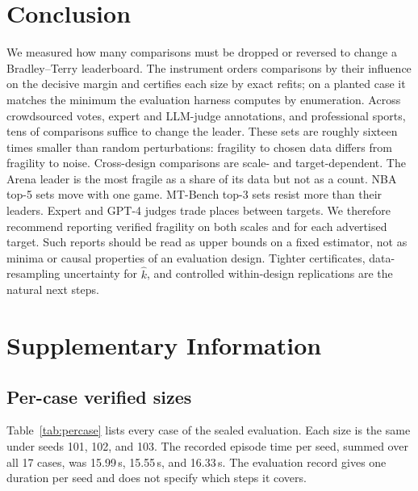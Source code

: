 \documentclass{article}
\newcommand{\kver}{\hat{k}}
\begin{document}
\section{Conclusion}
\label{sec:conclusion}

We measured how many comparisons must be dropped or reversed to change a Bradley--Terry leaderboard. The instrument orders comparisons by their influence on the decisive margin and certifies each size by exact refits; on a planted case it matches the minimum the evaluation harness computes by enumeration. Across crowdsourced votes, expert and LLM-judge annotations, and professional sports, tens of comparisons suffice to change the leader. These sets are roughly sixteen times smaller than random perturbations: fragility to chosen data differs from fragility to noise. Cross-design comparisons are scale- and target-dependent. The Arena leader is the most fragile as a share of its data but not as a count. NBA top-5 sets move with one game. MT-Bench top-3 sets resist more than their leaders. Expert and GPT-4 judges trade places between targets. We therefore recommend reporting verified fragility on both scales and for each advertised target. Such reports should be read as upper bounds on a fixed estimator, not as minima or causal properties of an evaluation design. Tighter certificates, data-resampling uncertainty for $\kver$, and controlled within-design replications are the natural next steps.

\clearpage



\clearpage
\appendix
\section{Supplementary Information}
\label{app:si}

\subsection{Per-case verified sizes}
\label{app:percase}

Table~\ref{tab:percase} lists every case of the sealed evaluation. Each size is the same under seeds 101, 102, and 103. The recorded episode time per seed, summed over all 17 cases, was 15.99\,s, 15.55\,s, and 16.33\,s. The evaluation record gives one duration per seed and does not specify which steps it covers.
\end{document}
